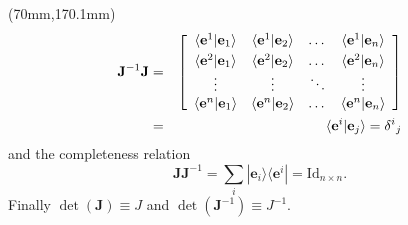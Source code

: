 \begin{textblock*}{70mm}(70mm,170.1mm)
\begin{eqnarray*}
  {\mathbf J}^{-1} {\mathbf J} & = &  \left[ \begin{array}{cccc}
                 \langle {\mathbf e}^1 | {\mathbf e}_1 \rangle & \langle {\mathbf e}^1 | {\mathbf e}_2 \rangle & \dots & \langle {\mathbf e}^1 | {\mathbf e}_n \rangle \vspace{1mm}\\
                 \langle {\mathbf e}^2 | {\mathbf e}_1 \rangle & \langle {\mathbf e}^2 | {\mathbf e}_2 \rangle & \dots & \langle {\mathbf e}^2 | {\mathbf e}_n \rangle \\
	    	     \vdots                   &     \vdots                 & \ddots &   \vdots \\
                 \langle {\mathbf e}^n | {\mathbf e}_1 \rangle & \langle {\mathbf e}^n | {\mathbf e}_2 \rangle & \dots & \langle {\mathbf e}^n | {\mathbf e}_n \rangle \\
			   \end{array} \right] \\
		   & = & \langle {\mathbf e}^i | {\mathbf e}_j \rangle = {\delta^i}_j
\end{eqnarray*}
and the completeness relation
\[
  {\mathbf J} {\mathbf J}^{-1} = \sum_i | {\mathbf e}_i \rangle \langle {\mathbf e}^i | = \mbox{Id}_{n \times n} .
\]
Finally $\det( {\mathbf J} ) \equiv J$ and $\det( {\mathbf J}^{-1}) \equiv J^{-1}$.
\end{textblock*}

